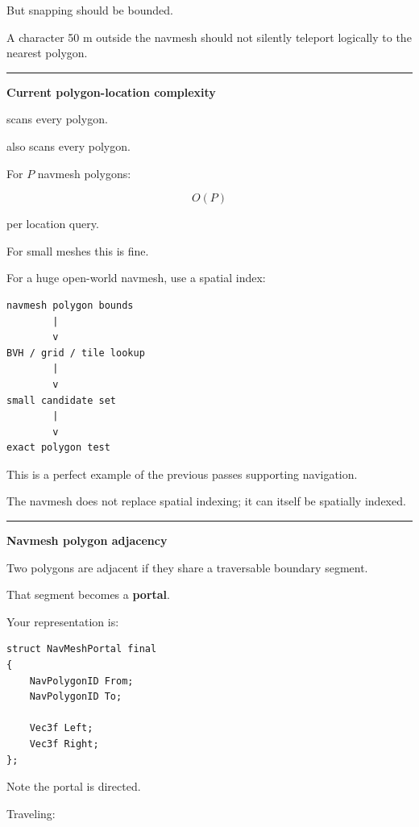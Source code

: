 But snapping should be bounded.

A character 50 m outside the navmesh should not silently teleport logically to the nearest polygon.

\begin{center}\rule{0.5\linewidth}{0.5pt}\end{center}

\textbf{Current polygon-location complexity}

 scans every polygon.

 also scans every polygon.

For \(P\) navmesh polygons:

\[
O(P)
\]

per location query.

For small meshes this is fine.

For a huge open-world navmesh, use a spatial index:

\begin{verbatim}
navmesh polygon bounds
        |
        v
BVH / grid / tile lookup
        |
        v
small candidate set
        |
        v
exact polygon test
\end{verbatim}

This is a perfect example of the previous passes supporting navigation.

The navmesh does not replace spatial indexing; it can itself be spatially indexed.

\begin{center}\rule{0.5\linewidth}{0.5pt}\end{center}

\textbf{Navmesh polygon adjacency}

Two polygons are adjacent if they share a traversable boundary segment.

That segment becomes a \textbf{portal}.

Your representation is:

\begin{verbatim}
struct NavMeshPortal final
{
    NavPolygonID From;
    NavPolygonID To;

    Vec3f Left;
    Vec3f Right;
};
\end{verbatim}

Note the portal is directed.

Traveling:

